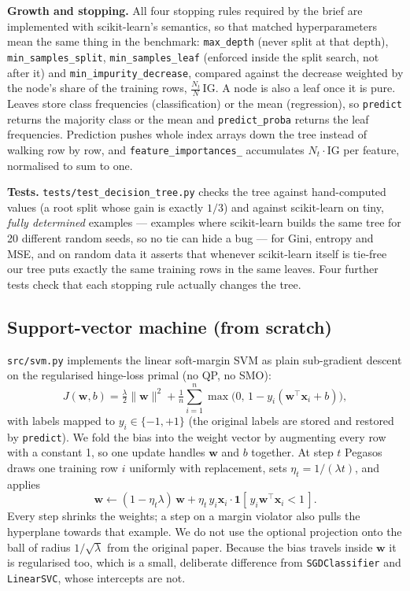 \documentclass[10pt,twocolumn,a4paper]{article}
\begin{document}
\textbf{Growth and stopping.} All four stopping rules required by the brief
are implemented with scikit-learn's semantics, so that matched hyperparameters
mean the same thing in the benchmark: \texttt{max\_depth} (never split at that
depth), \texttt{min\_samples\_split}, \texttt{min\_samples\_leaf} (enforced
inside the split search, not after it) and \texttt{min\_impurity\_decrease},
compared against the decrease weighted by the node's share of the training
rows, $\frac{N_t}{N}\,\mathrm{IG}$. A node is also a leaf once it is pure.
Leaves store class frequencies (classification) or the mean (regression), so
\texttt{predict} returns the majority class or the mean and
\texttt{predict\_proba} returns the leaf frequencies. Prediction pushes whole
index arrays down the tree instead of walking row by row, and
\texttt{feature\_importances\_} accumulates $N_t \cdot \mathrm{IG}$ per
feature, normalised to sum to one.

\textbf{Tests.} \texttt{tests/test\_decision\_tree.py} checks the tree against
hand-computed values (a root split whose gain is exactly $1/3$) and against
scikit-learn on tiny, \emph{fully determined} examples --- examples where
scikit-learn builds the same tree for 20 different random seeds, so no tie can
hide a bug --- for Gini, entropy and MSE, and on random data it asserts that
whenever scikit-learn itself is tie-free our tree puts exactly the same
training rows in the same leaves. Four further tests check that each stopping
rule actually changes the tree.

\subsection{Support-vector machine (from scratch)}
\texttt{src/svm.py} implements the linear soft-margin SVM as plain
sub-gradient descent on the regularised hinge-loss primal (no QP, no SMO):
\begin{equation}
  J(\mathbf{w},b)=\tfrac{\lambda}{2}\lVert\mathbf{w}\rVert^{2}
  +\tfrac{1}{n}\sum_{i=1}^{n}\max\!\big(0,\,1-y_i(\mathbf{w}^{\top}\mathbf{x}_i+b)\big),
\end{equation}
with labels mapped to $y_i\in\{-1,+1\}$ (the original labels are stored and
restored by \texttt{predict}). We fold the bias into the weight vector by
augmenting every row with a constant 1, so one update handles $\mathbf{w}$ and
$b$ together. At step $t$ Pegasos~\cite{pegasos} draws one training row $i$
uniformly with replacement, sets $\eta_t = 1/(\lambda t)$, and applies
\begin{equation}
  \mathbf{w} \leftarrow (1-\eta_t\lambda)\,\mathbf{w}
  + \eta_t\, y_i \mathbf{x}_i \cdot \mathbf{1}[\,y_i\mathbf{w}^{\top}\mathbf{x}_i < 1\,].
\end{equation}
Every step shrinks the weights; a step on a margin violator also pulls the
hyperplane towards that example. We do not use the optional projection onto
the ball of radius $1/\sqrt{\lambda}$ from the original paper. Because the
bias travels inside $\mathbf{w}$ it is regularised too, which is a small,
deliberate difference from \texttt{SGDClassifier} and \texttt{LinearSVC},
whose intercepts are not.
\end{document}
